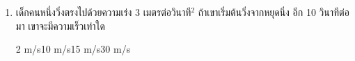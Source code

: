 \begin{enumerate}
	\item \runningj เด็กคนหนึ่งวิ่งตรงไปด้วยความเร่ง   3  เมตรต่อวินาที$^2$    ถ้าเขาเริ่มต้นวิ่งจากหยุดนิ่ง  อีก  	10  วินาทีต่อมา   เขาจะมีความเร็วเท่าใด
	\begin{4c}
		{2 m/s}{10 m/s}{15 m/s}{30 m/s}
	\end{4c}
\end{enumerate}
